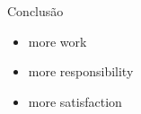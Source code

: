 \begin{frame}{Conclusão}
\begin{itemize}
\item more work
\medskip
\item more responsibility
\medskip
\item more satisfaction
\end{itemize}
    
\end{frame}

